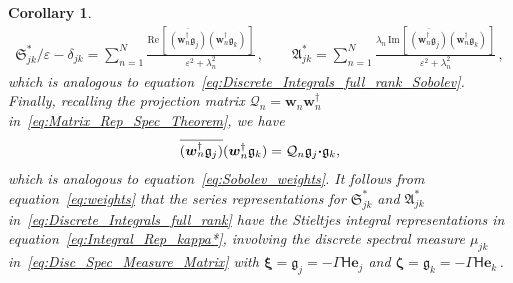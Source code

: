 \documentclass[english,12pt,jmp,graphicx]{revtex4-1}
\newcommand{\vecw}{\boldsymbol{w}}
\newcommand{\vecu}{\boldsymbol{u}}
\newcommand{\vecxi}{\boldsymbol{\xi}}
\newcommand{\veczeta}{\boldsymbol{\zeta}}
\newcommand{\vecz}{\boldsymbol{z}}
\newcommand{\vecg}{\mathfrak{g}}
\newcommand{\vece}{\boldsymbol{e}}
\newcommand{\bcdot}{\mbox{\boldmath${\cdot}$}}
\newcommand{\Sg}{\mathfrak{S}}
\newcommand{\Ag}{\mathfrak{A}}
\newtheorem{corollary}[theorem]{Corollary}
\newcommand{\Real}{\mbox{Re}\,}
\newcommand{\Imag}{\mbox{Im}\,}
\newcommand{\Hm}{\mathsf{H}}
\newcommand{\Qc}{\mathcal{Q}}
\begin{document}
\begin{corollary}
\begin{align}
  \Sg^*_{jk}/\varepsilon-\delta_{jk}=\sum_{n=1}^{N}
      \frac{\Real[\,\overline{(\vecw_n^\dagger\vecg_j)}
                              (\vecw_n^\dagger\vecg_k)\,]}
           {\varepsilon^2+\lambda_n^2}\,,
  \qquad
  \Ag^*_{jk}=\sum_{n=1}^{N}
      \frac{\lambda_n\,\Imag[\,\overline{(\vecw_n^\dagger\vecg_j)}
                                         (\vecw_n^\dagger\vecg_k)\,]}
           {\varepsilon^2+\lambda_n^2}\,,
\end{align}
%
which is analogous to 
equation~\eqref{eq:Discrete_Integrals_full_rank_Sobolev}.
Finally, recalling the projection matrix $\Qc_n=\vecw_n\vecw_n^\dagger$ 
in~\eqref{eq:Matrix_Rep_Spec_Theorem}, we have 
%
%
\begin{align}\label{eq:weights}
  \overline{(\vecw_n^\dagger\vecg_j)}(\vecw_n^\dagger\vecg_k)
  =\Qc_n\vecg_j\bcdot\vecg_k,
\end{align}
%
which is analogous to equation~\eqref{eq:Sobolev_weights}.
It follows from equation~\eqref{eq:weights}
that the series representations for $\Sg^*_{jk}$ and $\Ag^*_{jk}$
in~\eqref{eq:Discrete_Integrals_full_rank} have the Stieltjes   
integral representations in equation~\eqref{eq:Integral_Rep_kappa*},
involving the discrete spectral measure $\mu_{jk}$ 
in~\eqref{eq:Disc_Spec_Measure_Matrix} with 
$\vecxi=\vecg_j=-\Gamma\Hm\vece_j$ and $\veczeta=\vecg_k=-\Gamma\Hm\vece_k\,$.
%
\end{corollary}
%
\end{document}
